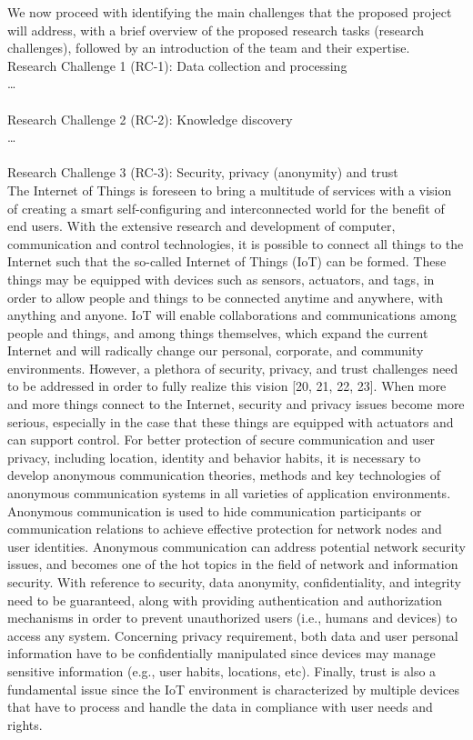 
We now proceed with identifying the main challenges that the proposed project will address, with a brief overview of the proposed research tasks (research challenges), followed by an introduction of the team and their expertise.\\

Research Challenge 1 (RC-1): Data collection and processing\\
…\\
\\

Research Challenge 2 (RC-2): Knowledge discovery\\
…\\
\\

Research Challenge 3 (RC-3): Security, privacy (anonymity) and trust\\

The Internet of Things is foreseen to bring a multitude of services with a vision of creating a smart self-configuring and interconnected world for the benefit of end users. With the extensive research and development of computer, communication and control technologies, it is possible to connect all things to the Internet such that the so-called Internet of Things (IoT) can be formed. These things may be equipped with devices such as sensors, actuators, and tags, in order to allow people and things to be connected anytime and anywhere, with anything and anyone. IoT will enable collaborations and communications among people and things, and among things themselves, which expand the current Internet and will radically change our personal, corporate, and community environments. However, a plethora of security, privacy, and trust challenges need to be addressed in order to fully realize this vision [20, 21, 22, 23]. When more and more things connect to the Internet, security and privacy issues become more serious, especially in the case that these things are equipped with actuators and can support control.
For better protection of secure communication and user privacy, including location, identity and behavior habits, it is necessary to develop anonymous communication theories, methods and key technologies of anonymous communication systems in all varieties of application environments. Anonymous communication is used to hide communication participants or communication relations to achieve effective protection for network nodes and user identities. Anonymous communication can address potential network security issues, and becomes one of the hot topics in the field of network and information security. With reference to security, data anonymity, confidentiality, and integrity need to be guaranteed, along with providing authentication and authorization mechanisms in order to prevent unauthorized users (i.e., humans and devices) to access any system. Concerning privacy requirement, both data and user personal information have to be confidentially manipulated since devices may manage sensitive information (e.g., user habits, locations, etc). Finally, trust is also a fundamental issue since the IoT environment is characterized by multiple devices that have to process and handle the data in compliance with user needs and rights.\\

